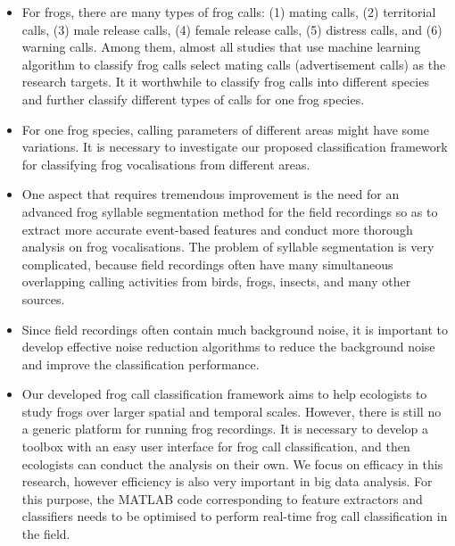 \begin{itemize}

\item For frogs, there are many types of frog calls: (1) mating calls, (2) territorial calls, (3) male release calls, (4) female release calls, (5) distress calls, and (6) warning calls. Among them, almost all studies that use machine learning algorithm to classify frog calls select mating calls (advertisement calls) as the research targets. It it worthwhile to classify frog calls into different species and further classify different types of calls for one frog species.


\item For one frog species, calling parameters of different areas might have some variations. It is necessary to investigate our proposed classification framework for classifying frog vocalisations from different areas.


\item  One aspect that requires tremendous improvement is the need for an advanced frog syllable segmentation method for the field recordings so as to extract more accurate event-based features and conduct more thorough analysis on frog vocalisations. The problem of syllable segmentation is very complicated, because field recordings often have many simultaneous overlapping calling activities from birds, frogs, insects, and many other sources. 

\item Since field recordings often contain much background noise, it is important to develop effective noise reduction algorithms to reduce the background noise and improve the classification performance.



\item Our developed frog call classification framework aims to help ecologists to study frogs over larger spatial and temporal scales. However, there is still no a generic platform for running frog recordings. It is necessary to develop a toolbox with an easy user interface for frog call classification, and then ecologists can conduct the analysis on their own. We focus on efficacy in this research, however efficiency is also very important in big data analysis. For this purpose, the MATLAB code corresponding to feature extractors and classifiers needs to be optimised to perform real-time frog call classification in the field.


\end{itemize}










